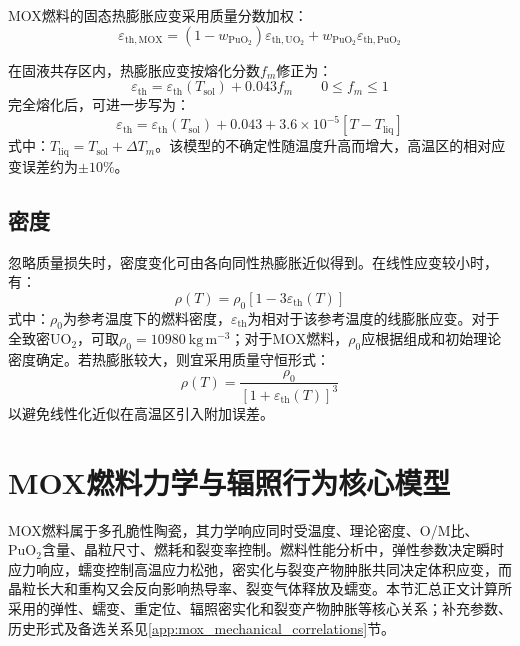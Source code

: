MOX燃料的固态热膨胀应变采用质量分数加权：
\begin{equation}
	\varepsilon_{\mathrm{th},\mathrm{MOX}}
	=(1-w_{\mathrm{PuO}_2})\varepsilon_{\mathrm{th},\mathrm{UO}_2}
	+w_{\mathrm{PuO}_2}\varepsilon_{\mathrm{th},\mathrm{PuO}_2}
	\label{eq:mox_solid_thermal_expansion}
\end{equation}

在固液共存区内，热膨胀应变按熔化分数$f_m$修正为：
\begin{equation}
	\varepsilon_{\mathrm{th}}
	=\varepsilon_{\mathrm{th}}(T_{\mathrm{sol}})+0.043f_m
	\qquad 0\leq f_m\leq1
	\label{eq:mox_partial_melting_expansion}
\end{equation}
完全熔化后，可进一步写为：
\begin{equation}
	\varepsilon_{\mathrm{th}}
	=\varepsilon_{\mathrm{th}}(T_{\mathrm{sol}})+0.043
	+3.6\times10^{-5}\left[T-T_{\mathrm{liq}}\right]
	\label{eq:mox_liquid_expansion}
\end{equation}
\noindent 式中：$T_{\mathrm{liq}}=T_{\mathrm{sol}}+\Delta T_m$。该模型的不确定性随温度升高而增大，高温区的相对应变误差约为$\pm10\%$。

\subsection{密度}

忽略质量损失时，密度变化可由各向同性热膨胀近似得到。在线性应变较小时，有：
\begin{equation}
	\rho(T)=\rho_0\left[1-3\varepsilon_{\mathrm{th}}(T)\right]
	\label{eq:mox_density_linearized}
\end{equation}
\noindent 式中：$\rho_0$为参考温度下的燃料密度，$\varepsilon_{\mathrm{th}}$为相对于该参考温度的线膨胀应变。对于全致密$\mathrm{UO}_2$，可取$\rho_0=10980\ \mathrm{kg\,m^{-3}}$；对于MOX燃料，$\rho_0$应根据组成和初始理论密度确定。若热膨胀较大，则宜采用质量守恒形式：
\begin{equation}
	\rho(T)=\frac{\rho_0}{\left[1+\varepsilon_{\mathrm{th}}(T)\right]^3}
	\label{eq:mox_density_exact}
\end{equation}
以避免线性化近似在高温区引入附加误差。

\section{MOX燃料力学与辐照行为核心模型}
\label{app:mox_core_mechanical_models}

MOX燃料属于多孔脆性陶瓷，其力学响应同时受温度、理论密度、O/M比、$\mathrm{PuO}_2$含量、晶粒尺寸、燃耗和裂变率控制。燃料性能分析中，弹性参数决定瞬时应力响应，蠕变控制高温应力松弛，密实化与裂变产物肿胀共同决定体积应变，而晶粒长大和重构又会反向影响热导率、裂变气体释放及蠕变。本节汇总正文计算所采用的弹性、蠕变、重定位、辐照密实化和裂变产物肿胀等核心关系；补充参数、历史形式及备选关系见\ref{app:mox_mechanical_correlations}节。

